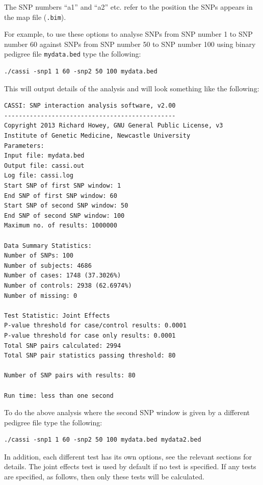 \documentclass[a4paper,12pt]{article}
\newcommand{\code}[1]{{\footnotesize{{\tt #1}}}}
\begin{document}
The SNP numbers ``a1'' and ``a2'' etc. refer to the position the SNPs appears in the map file (\code{.bim}). 

For example, to use these options to analyse SNPs from SNP number 1 to SNP number 60 against SNPs from SNP number 50 to SNP number 100 using binary pedigree file \code{mydata.bed} type the following: 
\vspace{0.35cm} \begin{lstlisting}
./cassi -snp1 1 60 -snp2 50 100 mydata.bed

\end{lstlisting} \vspace{0.35cm}
This will output details of the analysis and will look something like the following: 
\vspace{0.35cm} \begin{lstlisting}
CASSI: SNP interaction analysis software, v2.00
-----------------------------------------------
Copyright 2013 Richard Howey, GNU General Public License, v3
Institute of Genetic Medicine, Newcastle University
Parameters:
Input file: mydata.bed
Output file: cassi.out
Log file: cassi.log
Start SNP of first SNP window: 1
End SNP of first SNP window: 60
Start SNP of second SNP window: 50
End SNP of second SNP window: 100
Maximum no. of results: 1000000

Data Summary Statistics:
Number of SNPs: 100
Number of subjects: 4686
Number of cases: 1748 (37.3026%)
Number of controls: 2938 (62.6974%)
Number of missing: 0

Test Statistic: Joint Effects
P-value threshold for case/control results: 0.0001
P-value threshold for case only results: 0.0001
Total SNP pairs calculated: 2994
Total SNP pair statistics passing threshold: 80

Number of SNP pairs with results: 80

Run time: less than one second

\end{lstlisting} \vspace{0.35cm}
To do the above analysis where the second SNP window is given by a different pedigree file type the following: 
\vspace{0.35cm} \begin{lstlisting}
./cassi -snp1 1 60 -snp2 50 100 mydata.bed mydata2.bed

\end{lstlisting} \vspace{0.35cm}
In addition, each different test has its own options, see the relevant sections for details. The joint effects test is used by default if no test is specified. If any tests are specified, as follows, then only these tests will be calculated. 
\end{document}
